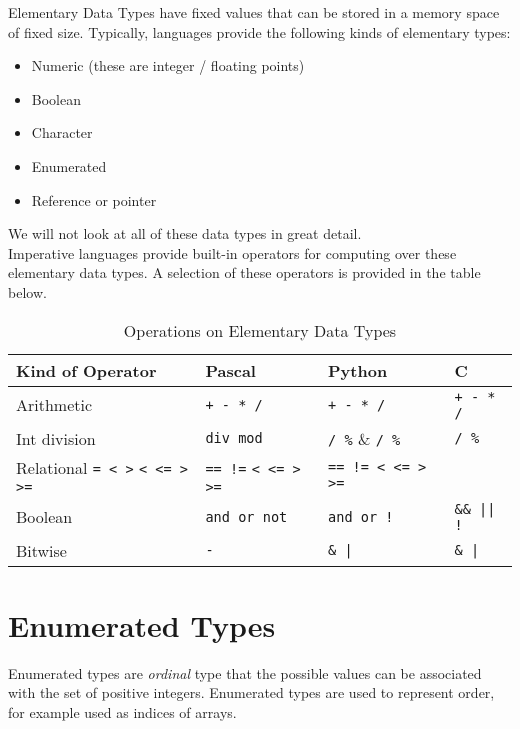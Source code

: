 
Elementary Data Types have fixed values that can be stored in a memory space of fixed size. Typically, languages provide the following kinds of elementary types:
\begin{itemize}
    \item Numeric (these are integer / floating points)
    \item Boolean
    \item Character
    \item Enumerated
    \item Reference or pointer
\end{itemize}
We will not look at all of these data types in great detail. \\

Imperative languages provide built-in operators for computing over these elementary data types. A selection of these operators is provided in the table below.

\begin{table}[H]
    \centering
    {\RaggedRight
    \begin{tabular}{p{} p{} p{} p{}}
    \textbf{Kind of Operator} & \textbf{Pascal} & \textbf{Python} & \textbf{C}\\
    \hline
    \hline
    Arithmetic & \verb|+ - * /| & \verb|+ - * /| & \verb|+ - * /|\\
    \hline
    Int division & \verb|div mod| & \verb|/ %| & \verb|/ %|\\
    \hline
    Relational \verb|= < >| \verb|< <= > >=| & \verb|== !=| \verb|< <= > >=| & \verb|== != < <= > >=|\\
    \hline
    Boolean & \verb|and or not| & \verb|and or !| & \verb+&& || !+\\
    \hline
    Bitwise & \verb|-| & \verb+& |+ & \verb+& |+\\
    \hline
    \end{tabular}
    } %
    \caption{Operations on Elementary Data Types}
\end{table}

\section{Enumerated Types}
Enumerated types are \textit{ordinal} type that the possible values can be associated with the set of positive integers. Enumerated types are used to represent order, for example used as indices of arrays.\\

